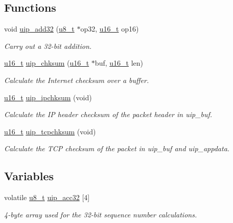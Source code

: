 \subsection*{Functions}
\begin{CompactItemize}
\item 
void \hyperlink{a00066_g6832e4d2d046536b6472f7ac92340f68}{uip\_\-add32} (\hyperlink{a00070_ge081489b4906f65a3cb18e9fbe9f8d23}{u8\_\-t} $\ast$op32, \hyperlink{a00070_gfc6499c1f28697aa3bfc2804d496fd11}{u16\_\-t} op16)
\begin{CompactList}\small\item\em Carry out a 32-bit addition. \item\end{CompactList}\item 
\hyperlink{a00070_gfc6499c1f28697aa3bfc2804d496fd11}{u16\_\-t} \hyperlink{a00066_gb6683dd83fe1c8de9a24086d4b69e907}{uip\_\-chksum} (\hyperlink{a00070_gfc6499c1f28697aa3bfc2804d496fd11}{u16\_\-t} $\ast$buf, \hyperlink{a00070_gfc6499c1f28697aa3bfc2804d496fd11}{u16\_\-t} len)
\begin{CompactList}\small\item\em Calculate the Internet checksum over a buffer. \item\end{CompactList}\item 
\hyperlink{a00070_gfc6499c1f28697aa3bfc2804d496fd11}{u16\_\-t} \hyperlink{a00066_g2addf34c7d457c1a7899a7e2171ef1e9}{uip\_\-ipchksum} (void)
\begin{CompactList}\small\item\em Calculate the IP header checksum of the packet header in uip\_\-buf. \item\end{CompactList}\item 
\hyperlink{a00070_gfc6499c1f28697aa3bfc2804d496fd11}{u16\_\-t} \hyperlink{a00066_g85b65e38aa74eba18979156f97a94a87}{uip\_\-tcpchksum} (void)
\begin{CompactList}\small\item\em Calculate the TCP checksum of the packet in uip\_\-buf and uip\_\-appdata. \item\end{CompactList}\end{CompactItemize}
\subsection*{Variables}
\begin{CompactItemize}
\item 
\hypertarget{a00066_g838108341703d67d15fc09e0808c2561}{
volatile \hyperlink{a00070_ge081489b4906f65a3cb18e9fbe9f8d23}{u8\_\-t} \hyperlink{a00066_g838108341703d67d15fc09e0808c2561}{uip\_\-acc32} \mbox{[}4\mbox{]}}
\label{a00066_g838108341703d67d15fc09e0808c2561}

\begin{CompactList}\small\item\em 4-byte array used for the 32-bit sequence number calculations. \item\end{CompactList}\end{CompactItemize}


